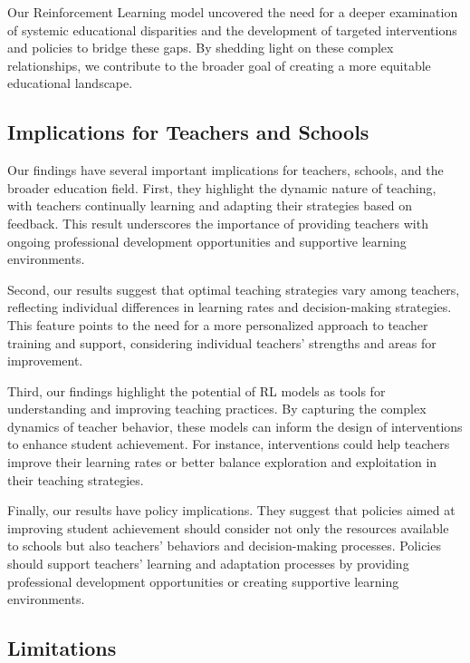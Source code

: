 \documentclass[
  number,
  preprint,
  3p,
  onecolumn]{elsarticle}
\begin{document}
Our Reinforcement Learning model uncovered the need for a deeper
examination of systemic educational disparities and the development of
targeted interventions and policies to bridge these gaps. By shedding
light on these complex relationships, we contribute to the broader goal
of creating a more equitable educational landscape.

\hypertarget{implications-for-teachers-and-schools}{%
\subsection{Implications for Teachers and
Schools}\label{implications-for-teachers-and-schools}}

Our findings have several important implications for teachers, schools,
and the broader education field. First, they highlight the dynamic
nature of teaching, with teachers continually learning and adapting
their strategies based on feedback. This result underscores the
importance of providing teachers with ongoing professional development
opportunities and supportive learning environments.

Second, our results suggest that optimal teaching strategies vary among
teachers, reflecting individual differences in learning rates and
decision-making strategies. This feature points to the need for a more
personalized approach to teacher training and support, considering
individual teachers' strengths and areas for improvement.

Third, our findings highlight the potential of RL models as tools for
understanding and improving teaching practices. By capturing the complex
dynamics of teacher behavior, these models can inform the design of
interventions to enhance student achievement. For instance,
interventions could help teachers improve their learning rates or better
balance exploration and exploitation in their teaching strategies.

Finally, our results have policy implications. They suggest that
policies aimed at improving student achievement should consider not only
the resources available to schools but also teachers' behaviors and
decision-making processes. Policies should support teachers' learning
and adaptation processes by providing professional development
opportunities or creating supportive learning environments.

\hypertarget{limitations}{%
\subsection{Limitations}\label{limitations}}
\end{document}
